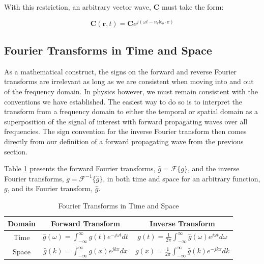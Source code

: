 With this restriction, an arbitrary vector wave, $\mathbf{C}$ must take the form:

\begin{equation}
\mathbf{C}\left(\mathbf{r},t\right) = \mathbf{C}e^{j\left(\omega t - n_r\mathbf{k}_o \cdot \mathbf{r} \right)}
\label{gf_eq:18b}
\end{equation}
\renewcommand{\baselinestretch}{2} \small\normalsize

\subsection {Fourier Transforms in Time and Space} \label{gf_sec:fourier_transform}
As a mathematical construct, the signs on the forward and reverse Fourier transforms are irrelevant as long as we are consistent when moving into and out of the frequency domain. In physics however, we must remain consistent with the conventions we have established. The easiest way to do so is to interpret the transform from a frequency domain to either the temporal or spatial domain as a superposition of the signal of interest with forward propagating waves over all frequencies. The sign convention for the inverse Fourier transform then comes directly from our definition of a forward propagating wave from the previous section.  

Table \ref{gf_tab:0a} presents the forward Fourier transforms, $\hat{g} = \mathcal{F}\{g\}$, and the inverse Fourier transforms, $g = \mathcal{F}^{-1}\{\hat{g}\}$, in both time and space for an arbitrary function, $g$, and its Fourier transform, $\hat{g}$.

\begin{table}[ht]
  \begin{center}
      \renewcommand{\baselinestretch}{1} \small\normalsize
  \begin{quote}
    \caption[Fourier Transforms in Time and Space]{Fourier Transforms in Time and Space\label{gf_tab:0a}}
  \end{quote}
  \begin{tabular} {|c | c | c|}
    \hline
  \bf{Domain} & \bf{Forward Transform} & \bf{Inverse Transform}\\ \hline
  Time & $\displaystyle \hat{g}(\omega) = \int_{-\infty}^{\infty} g(t)e^{-j\omega t}dt$ & $\displaystyle  g(t) = \frac{1}{2\pi}\int_{-\infty}^\infty \hat{g}(\omega)e^{j\omega t}d\omega$\\ \hline
 Space & $\displaystyle \hat{g}(k) = \int_{-\infty}^{\infty} g(x)e^{jk x}dx$ & $\displaystyle  g(x) = \frac{1}{2\pi}\int_{-\infty}^\infty \hat{g}(k)e^{-jk x}dk$\\ \hline
\end{tabular}
\end{center}
\end{table}
\renewcommand{\baselinestretch}{2} \small\normalsize

